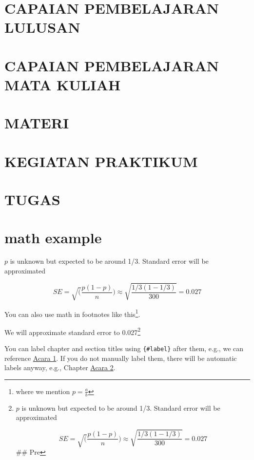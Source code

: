 \documentclass[
]{book}
\begin{document}
\hypertarget{capaian-pembelajaran-lulusan-4}{%
\section{CAPAIAN PEMBELAJARAN LULUSAN}\label{capaian-pembelajaran-lulusan-4}}

\hypertarget{capaian-pembelajaran-mata-kuliah-4}{%
\section{CAPAIAN PEMBELAJARAN MATA KULIAH}\label{capaian-pembelajaran-mata-kuliah-4}}

\hypertarget{materi-3}{%
\section{MATERI}\label{materi-3}}

\hypertarget{kegiatan-praktikum-4}{%
\section{KEGIATAN PRAKTIKUM}\label{kegiatan-praktikum-4}}

\hypertarget{tugas-4}{%
\section{TUGAS}\label{tugas-4}}

\hypertarget{math-example}{%
\section{math example}\label{math-example}}

\(p\) is unknown but expected to be around 1/3. Standard error will be approximated

\[
SE = \sqrt(\frac{p(1-p)}{n}) \approx \sqrt{\frac{1/3 (1 - 1/3)} {300}} = 0.027
\]

You can also use math in footnotes like this\footnote{where we mention \(p = \frac{a}{b}\)}.

We will approximate standard error to 0.027\footnote{\(p\) is unknown but expected to be around 1/3. Standard error will be approximated

  \[
  SE = \sqrt(\frac{p(1-p)}{n}) \approx \sqrt{\frac{1/3 (1 - 1/3)} {300}} = 0.027
  \]
  \#\# Pre}

You can label chapter and section titles using \texttt{\{\#label\}} after them, e.g., we can reference \protect\hyperlink{a1-pengenalan}{Acara 1}. If you do not manually label them, there will be automatic labels anyway, e.g., Chapter \protect\hyperlink{a2-deskriptif}{Acara 2}.
\end{document}
